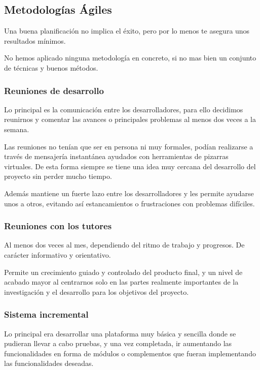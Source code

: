 \subsection*{Metodologías Ágiles}

Una buena planificación no implica el éxito, pero por lo menos te asegura unos
resultados mínimos.

No hemos aplicado ninguna metodología en concreto, si no mas bien un conjunto
de técnicas y buenos métodos.

\subsubsection*{Reuniones de desarrollo}
Lo principal es la comunicación entre los desarrolladores, para ello decidimos
reunirnos y comentar las avances o principales problemas al menos dos veces a
la semana.

Las reuniones no tenían que ser en persona ni muy formales, podían realizarse a
través de mensajería instantánea ayudados con herramientas de pizarras
virtuales. De
esta forma siempre se tiene una idea muy cercana del desarrollo del proyecto sin
perder mucho tiempo.

Además mantiene un fuerte lazo entre los desarrolladores y les permite ayudarse
unos a otros, evitando así estancamientos o frustraciones con problemas
difíciles.
\subsubsection*{Reuniones con los tutores}
Al menos dos veces al mes, dependiendo del ritmo de trabajo y progresos. De
carácter informativo y orientativo.

Permite un crecimiento guiado y controlado del producto final, y un nivel de
acabado mayor al centrarnos solo en las partes realmente importantes de la
investigación y el desarrollo para los objetivos del proyecto.

\subsubsection*{Sistema incremental}
Lo principal era desarrollar una plataforma muy básica y sencilla donde se
pudieran llevar a cabo pruebas, y una vez completada, ir aumentando las
funcionalidades en forma de módulos o complementos que fueran implementando las
funcionalidades deseadas.

